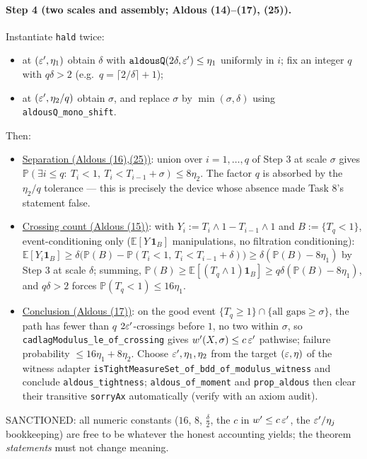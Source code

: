 \documentclass[11pt]{article}
\theoremstyle{plain}
\theoremstyle{remark}
\newcommand{\E}{\mathbb{E}}\newcommand{\PP}{\mathbb{P}}\newcommand{\R}{\mathbb{R}}
\begin{document}
\paragraph{Step 4 (two scales and assembly; Aldous (14)--(17), (25)).}
Instantiate \texttt{hald} twice:
\begin{itemize}
\item at $(\varepsilon',\eta_1)$ obtain $\delta$ with
$\texttt{aldousQ}(2\delta,\varepsilon')\le\eta_1$ uniformly in $i$; fix an integer
$q$ with $q\delta>2$ (e.g.\ $q=\lceil2/\delta\rceil+1$);
\item at $(\varepsilon',\eta_2/q)$ obtain $\sigma$, and replace $\sigma$ by
$\min(\sigma,\delta)$ using \texttt{aldousQ\_mono\_shift}.
\end{itemize}
Then:
\begin{itemize}
\item[(a)] \underline{Separation (Aldous (16),(25))}: union over
$i=1,\dots,q$ of Step 3 at scale $\sigma$ gives
$\PP(\exists i\le q:\ T_i<1,\ T_i<T_{i-1}+\sigma)\le 8\eta_2$. The factor
$q$ is absorbed by the $\eta_2/q$ tolerance --- this is precisely the
device whose absence made Task 8's statement false.
\item[(b)] \underline{Crossing count (Aldous (15))}: with $Y_i:=T_i\wedge1
-T_{i-1}\wedge1$ and $B:=\{T_q<1\}$, event-conditioning only
($\E[Y\,\mathbf1_B]$ manipulations, no filtration conditioning):
$\E[Y_i\mathbf1_B]\ge\delta\big(\PP(B)-\PP(T_i<1,\,T_i<T_{i-1}+\delta)\big)
\ge\delta(\PP(B)-8\eta_1)$ by Step 3 at scale $\delta$; summing,
$\PP(B)\ge\E[(T_q\wedge1)\mathbf1_B]\ge q\delta(\PP(B)-8\eta_1)$, and
$q\delta>2$ forces $\PP(T_q<1)\le 16\eta_1$.
\item[(c)] \underline{Conclusion (Aldous (17))}: on the good event
$\{T_q\ge1\}\cap\{\text{all gaps}\ge\sigma\}$, the path has fewer than $q$
$2\varepsilon'$-crossings before $1$, no two within $\sigma$, so
\texttt{cadlagModulus\_le\_of\_crossing} gives $w'(X,\sigma)\le c\,\varepsilon'$
pathwise; failure probability $\le16\eta_1+8\eta_2$. Choose
$\varepsilon',\eta_1,\eta_2$ from the target $(\varepsilon,\eta)$ of the witness adapter
\texttt{isTightMeasureSet\_of\_bdd\_of\_modulus\_witness} and conclude
\texttt{aldous\_tightness}; \texttt{aldous\_of\_moment} and
\texttt{prop\_aldous} then clear their transitive \texttt{sorryAx}
automatically (verify with an axiom audit).
\end{itemize}
SANCTIONED: all numeric constants ($16$, $8$, $\tfrac{\delta}{2}$, the
$c$ in $w'\le c\,\varepsilon'$, the $\varepsilon'/\eta_j$ bookkeeping) are free to be
whatever the honest accounting yields; the theorem \emph{statements} must
not change meaning.
\end{document}
